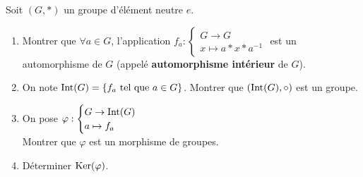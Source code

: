 \documentclass[12pt, a4paper]{report}
\begin{document}
\begin{exercise}
    Soit $(G,*)$ un groupe d'élément neutre $e$.

    \begin{enumerate}
        \item Montrer que $\forall a \in G$, l'application $f_a : \begin{cases}G \to G\\ x \mapsto a * x * a^{-1}\end{cases}$ est un automorphisme de $G$ (appelé \textbf{automorphisme intérieur} de $G$).
        \item On note $\mathrm{Int}(G) = \{f_a \text{ tel que } a \in G\}$. Montrer que $(\mathrm{Int}(G),\circ)$ est un groupe.
        \item On pose $\varphi : \begin{cases}G \to \mathrm{Int}(G)\\ a \mapsto f_a\end{cases}$\\Montrer que $\varphi$ est un morphisme de groupes.
        \item Déterminer $\mathrm{Ker}(\varphi)$.
    \end{enumerate}


\end{exercise}
\end{document}
